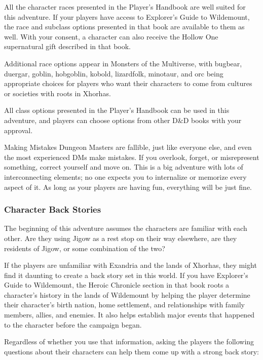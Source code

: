 \documentclass[10pt,a4paper,twoside,bg=print,twocolumn,openany,nodeprecatedcode]{dndbook}
\begin{document}
All the character races presented in the Player's Handbook are well suited for this adventure. If your players have access to Explorer's Guide to Wildemount, the race and subclass options presented in that book are available to them as well. With your consent, a character can also receive the Hollow One supernatural gift described in that book.

Additional race options appear in Monsters of the Multiverse, with bugbear, duergar, goblin, hobgoblin, kobold, lizardfolk, minotaur, and orc being appropriate choices for players who want their characters to come from cultures or societies with roots in Xhorhas.

All class options presented in the Player's Handbook can be used in this adventure, and players can choose options from other D\&D books with your approval.

\begin{DndSidebar}[float=!b]{Making Mistakes}
Dungeon Masters are fallible, just like everyone else, and even the most experienced DMs make mistakes. If you overlook, forget, or misrepresent something, correct yourself and move on. This is a big adventure with lots of interconnecting elements; no one expects you to internalize or memorize every aspect of it. As long as your players are having fun, everything will be just fine.



\end{DndSidebar}

\subsubsection{Character Back Stories}
The beginning of this adventure assumes the characters are familiar with each other. Are they using Jigow as a rest stop on their way elsewhere, are they residents of Jigow, or some combination of the two?

If the players are unfamiliar with Exandria and the lands of Xhorhas, they might find it daunting to create a back story set in this world. If you have Explorer's Guide to Wildemount, the Heroic Chronicle section in that book roots a character's history in the lands of Wildemount by helping the player determine their character's birth nation, home settlement, and relationships with family members, allies, and enemies. It also helps establish major events that happened to the character before the campaign began.

Regardless of whether you use that information, asking the players the following questions about their characters can help them come up with a strong back story:
\end{document}
